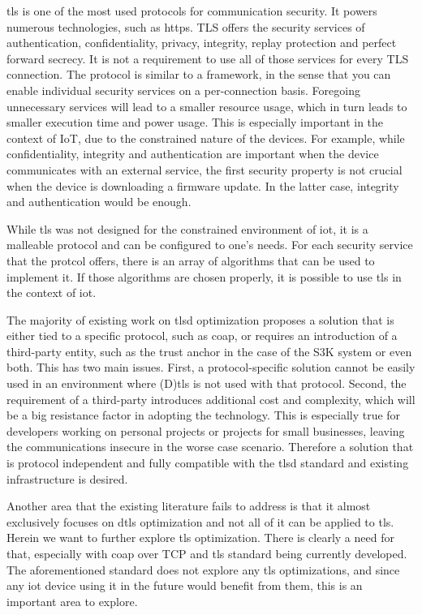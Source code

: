 \gls{tls} is one of the most used protocols for communication security. It
powers numerous technologies, such as \gls{https}. TLS offers the
security services of authentication, confidentiality, privacy, integrity, replay
protection and perfect forward secrecy. It is not a requirement to use all of
those services for every TLS connection. The protocol is similar to
a framework, in the sense that you can enable individual security
services on a per-connection basis. Foregoing unnecessary services will lead 
to a smaller resource usage, which in turn leads to smaller execution time and 
power usage. This is especially important in the context of IoT, due to the 
constrained nature of the devices. For example, while confidentiality, integrity and authentication 
are important when the device communicates with an external service, the first security property
is not crucial when the device is downloading a firmware update. In the latter case,
integrity and authentication would be enough.

While \gls{tls} was not designed for the constrained environment of \gls{iot}, it is a 
malleable protocol and can be configured to one's needs. For each security service that the protcol
offers, there is an array of algorithms that can be used to implement it.
If those algorithms are chosen properly, it is possible to use \gls{tls}
in the context of \gls{iot}.

The majority of existing work on \gls{tlsd} optimization proposes 
a solution that is either tied to a
specific protocol, such as \gls{coap}, or requires an introduction of a third-party
entity, such as the trust anchor in the case of the S3K system\cite{S3KScala62:online} or
even both. This has two main issues. First, a protocol-specific solution cannot
be easily used in an environment where (D)\gls{tls} is not used with that protocol.
Second, the requirement of a third-party
introduces additional cost and complexity, which will be a big resistance factor
in adopting the technology. This is especially true for developers working on
personal projects or projects for small businesses, leaving the communications insecure
in the worse case scenario. Therefore a solution that is protocol independent and fully 
compatible with the \gls{tlsd} standard and existing infrastructure is desired.

Another area that the existing literature fails to address is that it almost exclusively focuses on \gls{dtls} optimization
and not all of it can be applied to \gls{tls}. Herein we want to further explore \gls{tls} optimization. 
There is clearly a need for that,
especially with \gls{coap} over TCP and \gls{tls} standard\cite{I-D.ietf-core-coap-tcp-tls} being currently developed. The
aforementioned standard does not explore any \gls{tls} optimizations, and since any
\gls{iot} device using it in the future would benefit from them, this is an important
area to explore.

